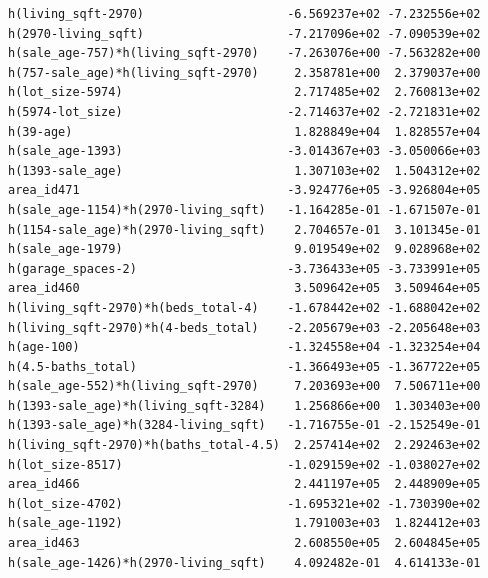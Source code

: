 \documentclass[
]{article}
\begin{document}
\begin{verbatim}
h(living_sqft-2970)                    -6.569237e+02 -7.232556e+02
h(2970-living_sqft)                    -7.217096e+02 -7.090539e+02
h(sale_age-757)*h(living_sqft-2970)    -7.263076e+00 -7.563282e+00
h(757-sale_age)*h(living_sqft-2970)     2.358781e+00  2.379037e+00
h(lot_size-5974)                        2.717485e+02  2.760813e+02
h(5974-lot_size)                       -2.714637e+02 -2.721831e+02
h(39-age)                               1.828849e+04  1.828557e+04
h(sale_age-1393)                       -3.014367e+03 -3.050066e+03
h(1393-sale_age)                        1.307103e+02  1.504312e+02
area_id471                             -3.924776e+05 -3.926804e+05
h(sale_age-1154)*h(2970-living_sqft)   -1.164285e-01 -1.671507e-01
h(1154-sale_age)*h(2970-living_sqft)    2.704657e-01  3.101345e-01
h(sale_age-1979)                        9.019549e+02  9.028968e+02
h(garage_spaces-2)                     -3.736433e+05 -3.733991e+05
area_id460                              3.509642e+05  3.509464e+05
h(living_sqft-2970)*h(beds_total-4)    -1.678442e+02 -1.688042e+02
h(living_sqft-2970)*h(4-beds_total)    -2.205679e+03 -2.205648e+03
h(age-100)                             -1.324558e+04 -1.323254e+04
h(4.5-baths_total)                     -1.366493e+05 -1.367722e+05
h(sale_age-552)*h(living_sqft-2970)     7.203693e+00  7.506711e+00
h(1393-sale_age)*h(living_sqft-3284)    1.256866e+00  1.303403e+00
h(1393-sale_age)*h(3284-living_sqft)   -1.716755e-01 -2.152549e-01
h(living_sqft-2970)*h(baths_total-4.5)  2.257414e+02  2.292463e+02
h(lot_size-8517)                       -1.029159e+02 -1.038027e+02
area_id466                              2.441197e+05  2.448909e+05
h(lot_size-4702)                       -1.695321e+02 -1.730390e+02
h(sale_age-1192)                        1.791003e+03  1.824412e+03
area_id463                              2.608550e+05  2.604845e+05
h(sale_age-1426)*h(2970-living_sqft)    4.092482e-01  4.614133e-01
                                                                  

\end{verbatim}
\end{document}
